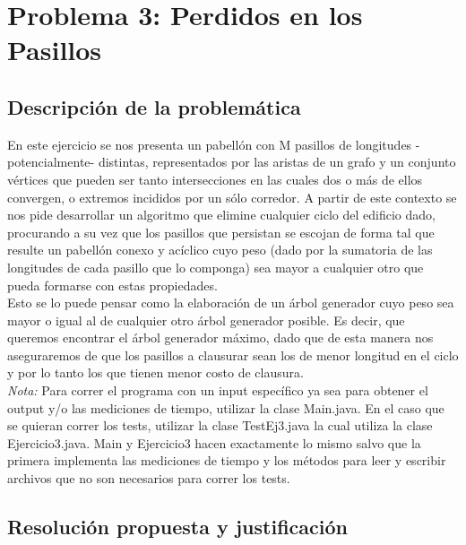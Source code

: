 \newpage
\section{Problema 3: Perdidos en los Pasillos}

\subsection{Descripción de la problemática}

En este ejercicio se nos presenta un pabellón con M pasillos de longitudes -potencialmente- distintas, representados por las aristas de un grafo y un conjunto vértices que pueden ser tanto intersecciones en las cuales dos o más de ellos convergen, o extremos incididos por un sólo corredor. 
A partir de este contexto se nos pide desarrollar un algoritmo que elimine cualquier ciclo del edificio dado, procurando a su vez que los pasillos que persistan se escojan de forma tal que resulte un pabellón conexo y acíclico cuyo peso (dado por la sumatoria de las longitudes de cada pasillo que lo componga) sea mayor a cualquier otro que pueda formarse con estas propiedades.\\
Esto se lo puede pensar como la elaboración de un árbol generador cuyo peso  sea mayor o igual al de cualquier otro árbol generador posible. Es decir, que queremos encontrar el árbol generador máximo, dado que de esta manera nos aseguraremos de que los pasillos a clausurar sean los de menor longitud en el ciclo y por lo tanto los que tienen menor costo de clausura.\\

\emph{Nota:} Para correr el programa con un input específico ya sea para obtener el output y/o las mediciones de tiempo, utilizar la clase Main.java. En el caso que se quieran correr los tests, utilizar la clase TestEj3.java la cual utiliza la clase Ejercicio3.java. Main y Ejercicio3 hacen exactamente lo mismo salvo que la primera implementa las mediciones de tiempo y los métodos para leer y escribir archivos que no son necesarios para correr los tests. 

\subsection{Resolución propuesta y justificación}

